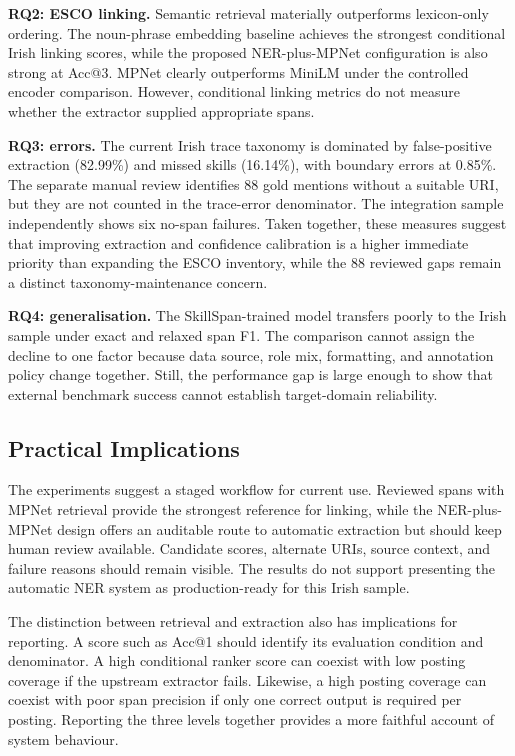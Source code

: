 \documentclass[conference]{IEEEtran}
\begin{document}
\textbf{RQ2: ESCO linking.} Semantic retrieval materially outperforms lexicon-only ordering. The noun-phrase embedding baseline achieves the strongest conditional Irish linking scores, while the proposed NER-plus-MPNet configuration is also strong at Acc@3. MPNet clearly outperforms MiniLM under the controlled encoder comparison. However, conditional linking metrics do not measure whether the extractor supplied appropriate spans.

\textbf{RQ3: errors.} The current Irish trace taxonomy is dominated by false-positive extraction (82.99\%) and missed skills (16.14\%), with boundary errors at 0.85\%. The separate manual review identifies 88 gold mentions without a suitable URI, but they are not counted in the trace-error denominator. The integration sample independently shows six no-span failures. Taken together, these measures suggest that improving extraction and confidence calibration is a higher immediate priority than expanding the ESCO inventory, while the 88 reviewed gaps remain a distinct taxonomy-maintenance concern.

\textbf{RQ4: generalisation.} The SkillSpan-trained model transfers poorly to the Irish sample under exact and relaxed span F1. The comparison cannot assign the decline to one factor because data source, role mix, formatting, and annotation policy change together. Still, the performance gap is large enough to show that external benchmark success cannot establish target-domain reliability.

\subsection{Practical Implications}
The experiments suggest a staged workflow for current use. Reviewed spans with MPNet retrieval provide the strongest reference for linking, while the NER-plus-MPNet design offers an auditable route to automatic extraction but should keep human review available. Candidate scores, alternate URIs, source context, and failure reasons should remain visible. The results do not support presenting the automatic NER system as production-ready for this Irish sample.

The distinction between retrieval and extraction also has implications for reporting. A score such as Acc@1 should identify its evaluation condition and denominator. A high conditional ranker score can coexist with low posting coverage if the upstream extractor fails. Likewise, a high posting coverage can coexist with poor span precision if only one correct output is required per posting. Reporting the three levels together provides a more faithful account of system behaviour.
\end{document}
